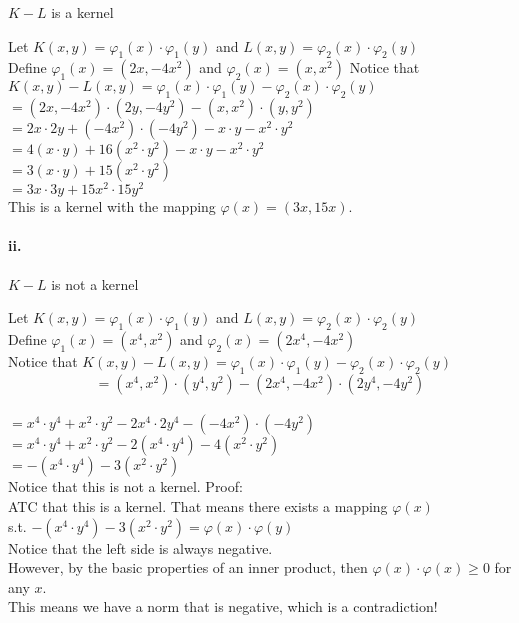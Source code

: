 \documentclass[12pt]{article}
\newcommand\tab[1][1cm]{\hspace*{#1}}
\begin{document}
$K - L$ is a kernel

Let $K(x,y) = \varphi_1(x)\cdot\varphi_1(y)$ and $L(x,y) = \varphi_2(x)\cdot\varphi_2(y)$ \\
			Define $\varphi_1(x) = (2x, -4x^2)$ and $\varphi_2(x) = (x, x^2) $
			Notice that $ K(x,y) - L(x,y) = \varphi_1(x)\cdot\varphi_1(y) - \varphi_2(x)\cdot\varphi_2(y) $ \\
			$ = (2x, -4x^2)\cdot(2y, -4y^2) - (x, x^2)\cdot(y,y^2) $ \\
			$ = 2x \cdot 2y + (-4x^2) \cdot (-4y^2) - x \cdot y - x^2 \cdot y^2 $ \\
			$ = 4(x \cdot y) + 16(x^2 \cdot y^2) - x \cdot y - x^2 \cdot y^2 $ \\
			$ = 3(x \cdot y) + 15(x^2 \cdot y^2) $ \\
			$ = 3x \cdot 3y + 15x^2 \cdot 15y^2 $ \\
			This is a kernel with the mapping $ \varphi(x) = (3x, 15x) $.

\paragraph{\tab ii.}

$K - L$ is not a kernel

Let $K(x,y) = \varphi_1(x)\cdot\varphi_1(y)$ and $L(x,y) = \varphi_2(x)\cdot\varphi_2(y)$ \\
Define $\varphi_1(x) = (x^4, x^2)$ and $\varphi_2(x) = (2x^4, -4x^2) $ \\
Notice that $ K(x,y) - L(x,y) = \varphi_1(x)\cdot\varphi_1(y) - \varphi_2(x)\cdot\varphi_2(y) $ \\
$$ = (x^4, x^2)\cdot(y^4,y^2) - (2x^4, -4x^2)\cdot(2y^4, -4y^2) $$ \\
$ = x^4 \cdot y^4 + x^2 \cdot y^2 - 2x^4 \cdot 2y^4 - (-4x^2) \cdot (-4y^2) $ \\
$ = x^4 \cdot y^4 + x^2 \cdot y^2 - 2(x^4 \cdot y^4) - 4(x^2 \cdot y^2) $ \\
$ = -(x^4 \cdot y^4) - 3(x^2 \cdot y^2) $ \\
Notice that this is not a kernel. Proof: \\
ATC that this is a kernel. That means there exists a mapping $\varphi(x)$ \\
s.t. $ -(x^4 \cdot y^4) - 3(x^2 \cdot y^2) = \varphi(x) \cdot \varphi(y) $ \\
Notice that the left side is always negative. \\
However, by the basic properties of an inner product, then $ \varphi(x)\cdot\varphi(x) \geq 0 $ for any $x$. \\
This means we have a norm that is negative, which is a contradiction!
			
\end{document}
